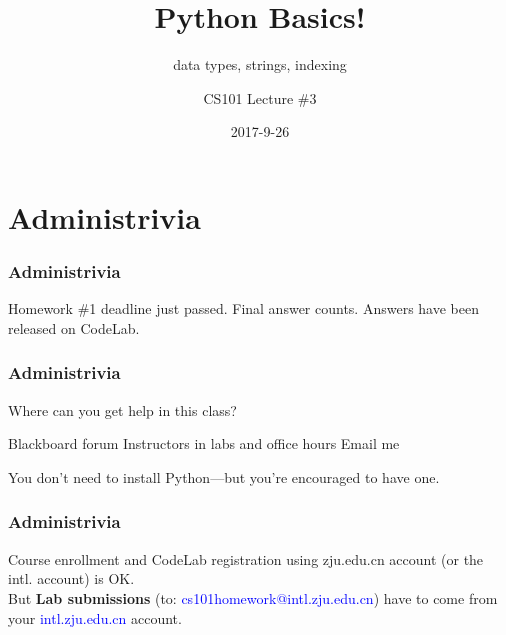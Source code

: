 \documentclass[11pt]{beamer}
\title{Python Basics!}
\subtitle{data types, strings, indexing}
\author{CS101 Lecture \#3}
\date{2017-9-26}
\begin{document}
  \setcounter{showProgressBar}{0}
  \setcounter{showSlideNumbers}{0}

\frame{\titlepage}

\setcounter{framenumber}{0}
\setcounter{showProgressBar}{1}
\setcounter{showSlideNumbers}{1}

\section{Administrivia}

\begin{frame}
  \frametitle{Administrivia}
  \Enlarge
  \begin{itemize}
  \mysubitem  Homework \#1 deadline just passed.
  \mysubitem  Final answer counts.
  \mysubitem  Answers have been released on CodeLab.
  \end{itemize}
\end{frame}

\begin{frame}
  \frametitle{Administrivia}
  \Enlarge
  \begin{itemize}
  \myitem  Where can you get help in this class?
    \begin{itemize}
    \mysubitem  Blackboard forum 
    \mysubitem  Instructors in labs and office hours 
    \mysubitem  Email me
    \end{itemize} \pause
   \myitem  You don't need to install Python---but you're encouraged to have one.
  \end{itemize}
\end{frame}

\begin{frame}
  \frametitle{Administrivia}
  Course enrollment and CodeLab registration using zju.edu.cn account (or the intl. account) is OK. \\
  
  \vspace{2mm}
  But {\bf Lab submissions} (to: \textcolor{blue}{cs101homework@intl.zju.edu.cn}) have to come from your \textcolor{blue}{intl.zju.edu.cn} account.
\end{frame}
\end{document}
